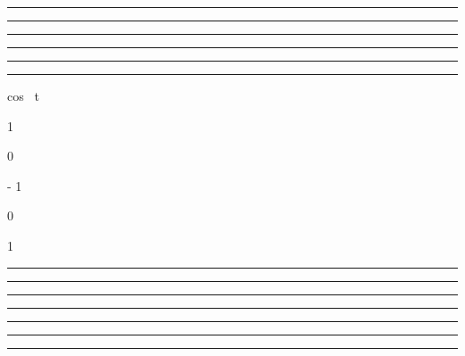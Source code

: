 \documentclass[]{article}
\begin{document}
\begin{center}\rule{3in}{0.4pt}\end{center}

\begin{center}\rule{3in}{0.4pt}\end{center}

\begin{center}\rule{3in}{0.4pt}\end{center}

\begin{center}\rule{3in}{0.4pt}\end{center}

\begin{center}\rule{3in}{0.4pt}\end{center}

\begin{center}\rule{3in}{0.4pt}\end{center}

 cos~ t

1

\searrow

0

\searrow

- 1

\nearrow

0

\nearrow

1

\begin{center}\rule{3in}{0.4pt}\end{center}

\begin{center}\rule{3in}{0.4pt}\end{center}

\begin{center}\rule{3in}{0.4pt}\end{center}

\begin{center}\rule{3in}{0.4pt}\end{center}

\begin{center}\rule{3in}{0.4pt}\end{center}

\begin{center}\rule{3in}{0.4pt}\end{center}

\begin{center}\rule{3in}{0.4pt}\end{center}
\end{document}
